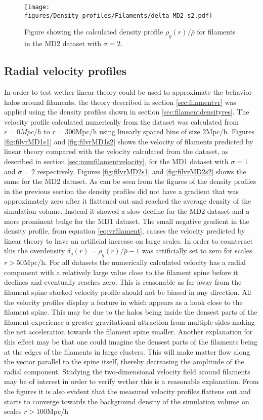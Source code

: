 \begin{figure}[H]
    \texttt{[image: figures/Density\_profiles/Filaments/delta\_MD2\_s2.pdf]}
    \caption{Figure showing the calculated density profile $\rho_g(r)/\bar{\rho}$ for filaments in the MD2 dataset with $\sigma=2$.}
    \label{fig:fildensitytMD2s2}
\end{figure}
\subsection{Radial velocity profiles}
In order to test wether linear theory could be used to approximate the behavior halos around filaments, the theory described in section \ref{sec:filamentvr} was applied using the density profiles shown in section \ref{sec:filamentdensityres}. The velocity profile calculated numerically from the dataset was calculated from $r=0Mpc/h$ to $r=300$Mpc/h using linearly spaced bins of size $2$Mpc/h. Figures \ref{fig:filvrMD1s1} and \ref{fig:filvrMD1s2} shows the velocity of filaments predicted by linear theory compared with the velocity calculated from the dataset, as described in section \ref{sec:numfilamentvelocity}, for the MD1 dataset with $\sigma=1$ and $\sigma=2$ respectively. Figures \ref{fig:filvrMD2s1} and \ref{fig:filvrMD2s2} shows the same for the MD2 dataset. As can be seen from the figures of the density profiles in the previous section the density profiles did not have a gradient that was approximately zero after it flattened out and reached the average density of the simulation volume. Instead it showed a slow decline for the MD2 dataset and a more prominent bulge for the MD1 dataset. The small negative gradient in the density profile, from equation \ref{eq:vrfilament}, causes the velocity predicted by linear theory to have an artificial increase on large scales. In order to counteract this the overdensity $\delta_g(r)=\rho_g(r)/\bar{\rho}-1$ was artificially set to zero for scales $r>50$Mpc/h. For all datasets the numerically calculated velocity has a radial component with a relatively large value close to the filament spine before it declines and eventually reaches zero. This is reasonable as far away from the filament spine stacked velocity profile should not be biased in any direction. All the velocity profiles display a feature in which appears as a hook close to the filament spine. This may be due to the halos being inside the densest parts of the filament experience a greater gravitational attraction from multiple sides making the net acceleration towards the filament spine smaller. Another explanation for this effect may be that one could imagine the densest parts of the filaments being at the edges of the filaments in large clusters. This will make matter flow along the vector parallel to the spine itself, thereby decreasing the amplitude of the radial component. Studying the two-dimensional velocity field around filaments may be of interest in order to verify wether this is a reasonable explanation. From the figures it is also evident that the measured velocity profiles flattens out and starts to converge towards the background density of the simulation volume on scales $r>100$Mpc/h \\\indent
